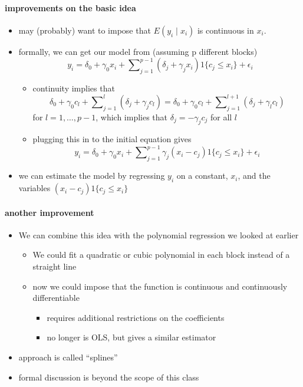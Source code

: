 \paragraph{improvements on the basic idea}
\begin{itemize}
\item may (probably) want to impose that $E(y_i \mid x_i)$ is
         continuous in $x_i$.
\item formally, we can get our model from (assuming p different blocks)
         \[ y_i = \delta_0 + \gamma_0 x_i + \sum\nolimits_{j=1}^{p-1} (\delta_j + \gamma_j x_i) 1\{c_j \leq
         x_i\} + \epsilon_i\]
\begin{itemize}
\item continuity implies that
           \[ \delta_0 + \gamma_0 c_l + \sum\nolimits_{j=1}^l (\delta_j +
           \gamma_j c_l) = \delta_0 + \gamma_0 c_l + \sum\nolimits_{j=1}^{l+1}
           (\delta_j + \gamma_l c_l)\] 
           for $l = 1,\dots,p-1$, which implies that $\delta_j = -
           \gamma_j c_j$ for all $l$
\item plugging this in to the initial equation gives
           \[ y_i = \delta_0 + \gamma_0 x_i + \sum\nolimits_{j=1}^{p-1}
           \gamma_j (x_i - c_j) 1\{c_j \leq x_i\} + \epsilon_i\]
\end{itemize}
\item we can estimate the model by regressing $y_i$ on a constant,
         $x_i$, and the variables $(x_i - c_j) 1\{c_j \leq x_i\}$
\end{itemize}

\paragraph{another improvement}
\begin{itemize}
\item We can combine this idea with the polynomial regression we
         looked at earlier
\begin{itemize}
\item We could fit a quadratic or cubic polynomial in each block
           instead of a straight line
\item now we could impose that the function is continuous and
           continuously differentiable
\begin{itemize}
\item requires additional restrictions on the coefficients
\item no longer is OLS, but gives a similar estimator
\end{itemize}
\end{itemize}
\item approach is called ``splines''
\item formal discussion is beyond the scope of this class
\end{itemize}

